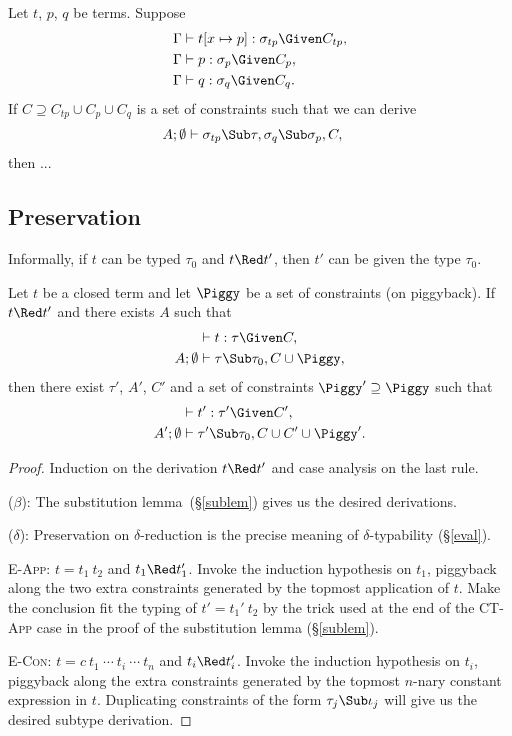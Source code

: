 \documentclass{amsart}
\theoremstyle{definition}
\begin{document}
\def\Exi{\emptyset}

Let $t$, $p$, $q$ be terms. Suppose
\begin{align*}
\Gamma&\vdash t[x\mapsto p]:\sigma_{tp}\Given C_{tp},
\\
\Gamma&\vdash p:\sigma_p \Given C_p,
\\
\Gamma&\vdash q:\sigma_q \Given C_q.
\end{align*}
If $C\supseteq C_{tp}\cup C_p\cup C_q$ is a set of constraints
such that we can derive
\begin{align}
A;\Exi&\vdash
\sigma_{tp}\Sub\tau,
\sigma_q\Sub\sigma_p,
C,
\label{eq:subass}
\end{align}
then ...




\subsection{Preservation}
\label{preservation}

Informally, if $t$ can be typed $\tau_0$ and $t\Red t'$,
then $t'$ can be given the type $\tau_0$.

Let $t$ be a closed term and let $\Piggy$ be a set of constraints
(on piggyback). If $t\Red t'$ and there exists $A$ such that
\begin{align*}
&\vdash t:\tau \Given C,\\
A;\emptyset&\vdash \tau\Sub\tau_0,C\cup\Piggy,
\end{align*}
then there exist $\tau'$, $A'$, $C'$ and a set of constraints
$\Piggy'\supseteq\Piggy$ such that
\begin{align*}
&\vdash t':\tau'\Given C',\\
A';\emptyset&\vdash \tau'\Sub\tau_0,C\cup C'\cup\Piggy'.
\end{align*}

\begin{proof}
Induction on the derivation $t\Red t'$ and case analysis on the
last rule.

\Case($\beta$): The substitution lemma~(\S\ref{sublem}) gives us
the desired derivations.

\Case($\delta$): Preservation on $\delta$-reduction is the
precise meaning of $\delta$-typability (\S\ref{eval}).

\Case\textsc{E-App}: $t=t_1~t_2$ and $t_1\Red t_1'$. Invoke the
induction hypothesis on $t_1$, piggyback along the two extra
constraints generated by the topmost application of $t$. Make
the conclusion fit the typing of $t'=t_1'~t_2$ by the trick used
at the end of the \textsc{CT-App} case in the proof of the
substitution lemma (\S\ref{sublem}).

\Case\textsc{E-Con}: $t=c~t_1~\cdots~t_i~\cdots~t_n$ and $t_i\Red
t_i'$. Invoke the induction hypothesis on $t_i$, piggyback along
the extra constraints generated by the topmost $n$-nary constant
expression in $t$. Duplicating constraints of the form
$\tau_j\Sub\iota_j$ will give us the desired subtype derivation.
\end{proof}
\end{document}

